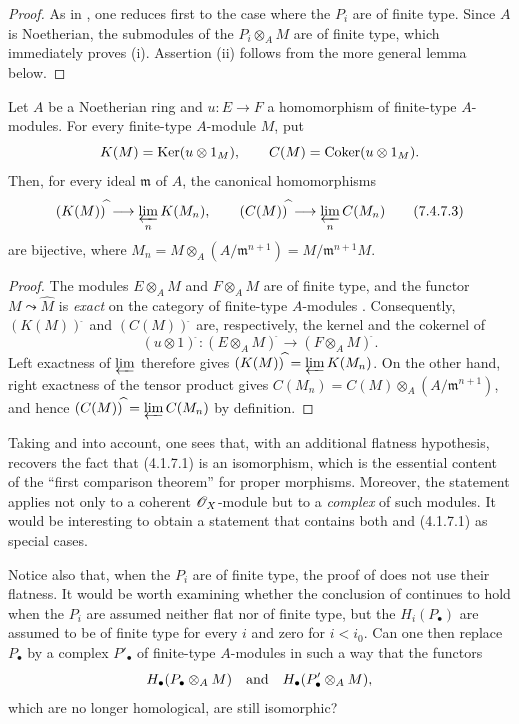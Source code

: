 \begin{proof}
As in , one reduces first to the case where the
$P_i$ are of finite type.  Since $A$ is Noetherian, the
submodules of the $P_i\otimes_A M$ are of finite type, which
immediately proves (i).  Assertion (ii) follows from the more
general lemma below.
\end{proof}

\begin{lemma}[7.4.7.2]
\label{III.7.4.7.2}
Let $A$ be a Noetherian ring and $u:E\to F$ a homomorphism of
finite-type $A$-modules.  For every finite-type $A$-module
$M$, put
\[
  K(M)=\operatorname{Ker}(u\otimes 1_M),
  \qquad
  C(M)=\operatorname{Coker}(u\otimes 1_M).
\]
Then, for every ideal $\mathfrak m$ of $A$, the canonical
homomorphisms
\[
  (K(M))^{\widehat{\,}}
  \longrightarrow
  \varprojlim_n K(M_n),
  \qquad
  (C(M))^{\widehat{\,}}
  \longrightarrow
  \varprojlim_n C(M_n)
  \tag{7.4.7.3}\label{III.7.4.7.3.eq}
\]
are bijective, where $M_n
=
M\otimes_A(A/\mathfrak m^{n+1})
=
M/\mathfrak m^{n+1}M$.
\end{lemma}

\begin{proof}
The modules $E\otimes_A M$ and $F\otimes_A M$ are of finite
type, and the functor $M\leadsto\widehat{M}$ is \emph{exact} on the
category of finite-type $A$-modules .
Consequently, $(K(M))^{\widehat{\,}}$ and $(C(M))^{\widehat{\,}}$ are,
respectively, the kernel and the cokernel of
\[
  (u\otimes 1)^{\widehat{\,}}:
  (E\otimes_A M)^{\widehat{\,}}
  \longrightarrow
  (F\otimes_A M)^{\widehat{\,}}.
\]
Left exactness of $\varprojlim$ therefore gives $(K(M))^{\widehat{\,}}
=
\varprojlim K(M_n)$.
On the other hand, right exactness of the tensor product gives $C(M_n)
=
C(M)\otimes_A(A/\mathfrak m^{n+1})$,
and hence $(C(M))^{\widehat{\,}}
=
\varprojlim C(M_n)$
by definition.
\end{proof}

\begin{remark}[7.4.8]
\label{III.7.4.8}
Taking  and  into account,
one sees that, with an additional flatness hypothesis,
 recovers the fact that
(4.1.7.1) is an isomorphism, which is the
essential content of the ``first comparison theorem'' for
proper morphisms.  Moreover, the statement applies not only
to a coherent $\mathscr{O}_X$-module but to a \emph{complex} of
such modules.  It would be interesting to obtain a statement
that contains both  and
(4.1.7.1) as special cases.

Notice also that, when the $P_i$ are of finite type, the proof
of  does not use their flatness.  It would be
worth examining whether the conclusion of 
continues to hold when the $P_i$ are assumed neither flat nor
of finite type, but the $H_i(P_\bullet)$ are assumed to be of
finite type for every $i$ and zero for $i<i_0$.  Can one then
replace $P_\bullet$ by a complex $P'_\bullet$ of finite-type
$A$-modules in such a way that the functors
\[
  H_\bullet(P_\bullet\otimes_A M)
  \quad\hbox{and}\quad
  H_\bullet(P'_\bullet\otimes_A M),
\]
which are no longer homological, are still isomorphic?
\end{remark}
